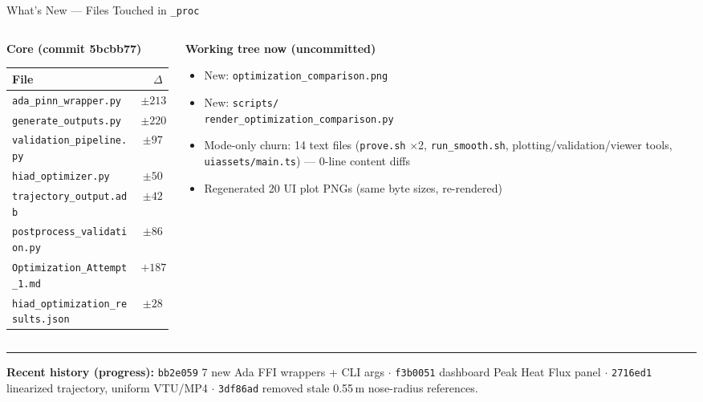 \documentclass[aspectratio=169,10pt]{beamer}
\begin{document}
\begin{frame}{What's New --- Files Touched in \texttt{\_proc}}
  \begin{columns}[T]
    \begin{column}{0.52\textwidth}
      \textbf{Core (commit 5bcbb77)}\\[2pt]
      \scriptsize
      \begin{tabular}{@{}lr@{}}
        \toprule
        File & $\Delta$ \\
        \midrule
        \texttt{ada\_pinn\_wrapper.py} & $\pm 213$ \\
        \texttt{generate\_outputs.py} & $\pm 220$ \\
        \texttt{validation\_pipeline.py} & $\pm 97$ \\
        \texttt{hiad\_optimizer.py} & $\pm 50$ \\
        \texttt{trajectory\_output.adb} & $\pm 42$ \\
        \texttt{postprocess\_validation.py} & $\pm 86$ \\
        \texttt{Optimization\_Attempt\_1.md} & $+187$ \\
        \texttt{hiad\_optimization\_results.json} & $\pm 28$ \\
        \bottomrule
      \end{tabular}
    \end{column}
    \begin{column}{0.46\textwidth}
      \textbf{Working tree now (uncommitted)}\\[2pt]
      \begin{itemize}\scriptsize
        \item New: \texttt{optimization\_comparison.png}
        \item New: \texttt{scripts/}\\
              \texttt{render\_optimization\_comparison.py}
        \item Mode-only churn: 14 text files
              (\texttt{prove.sh} $\times$2, \texttt{run\_smooth.sh},
              plotting/validation/viewer tools, \texttt{uiassets/main.ts})
              --- 0-line content diffs
        \item Regenerated 20 UI plot PNGs (same byte sizes,
              re-rendered)
      \end{itemize}
    \end{column}
  \end{columns}
  \vspace{4pt}
  \hrule
  \vspace{4pt}
  \textbf{Recent history (progress):}
  \texttt{bb2e059} 7 new Ada FFI wrappers + CLI args $\cdot$
  \texttt{f3b0051} dashboard Peak Heat Flux panel $\cdot$
  \texttt{2716ed1} linearized trajectory, uniform VTU/MP4 $\cdot$
  \texttt{3df86ad} removed stale 0.55\,m nose-radius references.
\end{frame}
\end{document}

